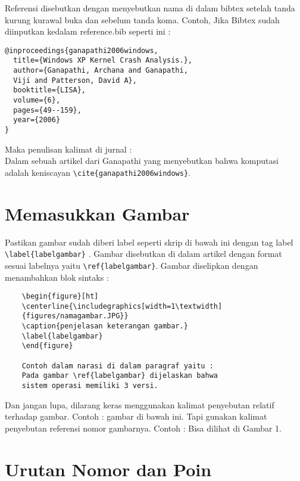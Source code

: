 Referensi disebutkan dengan menyebutkan nama di dalam bibtex setelah tanda kurung kurawal buka dan sebelum tanda koma. Contoh, Jika Bibtex sudah diinputkan kedalam reference.bib seperti ini :
\begin{verbatim}
@inproceedings{ganapathi2006windows,
  title={Windows XP Kernel Crash Analysis.},
  author={Ganapathi, Archana and Ganapathi, 
  Viji and Patterson, David A},
  booktitle={LISA},
  volume={6},
  pages={49--159},
  year={2006}
}
\end{verbatim}
Maka penulisan kalimat di jurnal : \\
Dalam sebuah artikel dari Ganapathi yang 
menyebutkan bahwa komputasi adalah keniscayan \verb|\cite{ganapathi2006windows}|.


\section{Memasukkan Gambar}

Pastikan gambar sudah diberi label seperti skrip di bawah ini dengan tag label \verb|\label{labelgambar}| . Gambar disebutkan di dalam artikel dengan format sesuai labelnya yaitu \verb|\ref{labelgambar}|. Gambar diselipkan dengan menambahkan blok sintaks :
    \begin{verbatim}
    \begin{figure}[ht]
    \centerline{\includegraphics[width=1\textwidth]
    {figures/namagambar.JPG}}
    \caption{penjelasan keterangan gambar.}
    \label{labelgambar}
    \end{figure}
    
   	Contoh dalam narasi di dalam paragraf yaitu :
    Pada gambar \ref{labelgambar} dijelaskan bahwa 
    sistem operasi memiliki 3 versi.
    \end{verbatim}

Dan jangan lupa, dilarang keras menggunakan kalimat penyebutan relatif terhadap gambar. Contoh : gambar di bawah ini. Tapi gunakan kalimat penyebutan referensi nomor gambarnya. Contoh : Bisa dilihat di Gambar 1.

\section{Urutan Nomor dan Poin}

